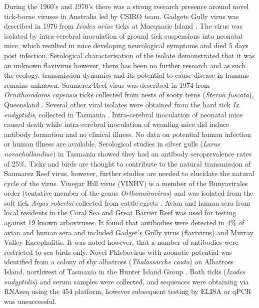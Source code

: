 \documentclass[a4paper, nobind]{templates/ociamthesis}
\begin{document}
During the 1960's and 1970's there was a strong research presence around novel tick-borne viruses in Australia led by CSIRO team.
Gadgets Gully virus was described in 1976 from \emph{Ixodes uriae} ticks at Macquarie Island \autocite{st.georgeIsolationArbovirusesIncluding1985}.
The virus was isolated by intra-cerebral inoculation of ground tick suspensions into neonatal mice, which resulted in mice developing neurological symptoms and died 5 days post infection.
Serological characterisation of the isolate demonstrated that it was an unknown flavivirus however, there has been no further research and as such the ecology, transmission dynamics and its potential to cause disease in humans remains unknown.
Saumerez Reef virus was described in 1974 from \emph{Ornithorodoros capensis} ticks collected from nests of sooty terns (\emph{Sterna fuscata}), Queensland \autocite{st.georgeIsolationSaumarezReef1977}.
Several other viral isolates were obtained from the hard tick \emph{Ix. eudyptidis}, collected in Tasmania \autocite{st.georgeIsolationSaumarezReef1977}.
Intra-cerebral inoculation of neonatal mice caused death while intra-cerebral inoculation of weanling mice did induce antibody formation and no clinical illness.
No data on potential human infection or human illness are available.
Serological studies in silver gulls (\emph{Larus novaehollandiae}) in Tasmania showed they had an antibody seroprevalence rates of 25\%. Ticks and birds are thought to contribute to the natural transmission of Saumarez Reef virus, however, further studies are needed to elucidate the natural cycle of the virus.
Vinegar Hill virus (VINHV) is a member of the Bunyavirales order (tentative member of the genus \emph{Orthonairovirus}) and was isolated from the soft tick \emph{Argas robertsi} collected from cattle egrets \autocite{gauciGenomicCharacterisationVinegar2017}.
Avian and human sera from local residents in the Coral Sea and Great Barrier Reef was used for testing against 19 known arboviruses.
It found that antibodies were detected in 4\% of avian and human sera and included Gadget's Gully virus (flavivirus) and Murray Valley Encephalitis.
It was noted however, that a number of antibodies were restricted to sea birds only.
Novel Phlebovirus with zoonotic potential was identified from a colony of shy albatross (\emph{Thalassarche cauta}) on Albatross Island, northwest of Tasmania in the Hunter Island Group \autocite{wangNovelPhlebovirusZoonotic2014}.
Both ticks (\emph{Ixodes eudyptidis}) and serum samples were collected, and sequences were obtaining via RNAseq using the 454 platform, however subsequent testing by ELISA or qPCR was unsuccessful.
\end{document}
